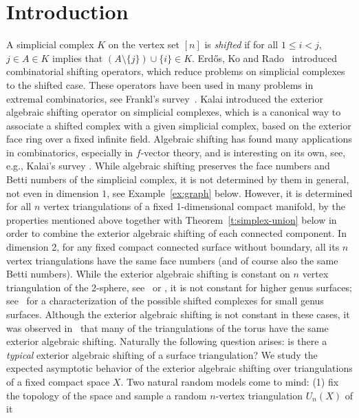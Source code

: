 \documentclass[11pt]{article}
\numberwithin{claimcounter}{theorem}
\theoremstyle{remark}
\theoremstyle{definition}
\numberwithin{theorem}{section}
\begin{document}
\section{Introduction}
A simplicial complex $K$ on the vertex set $[n]$ is \emph{shifted} if for all $1\le i <j$,   $j\in A\in K$ implies that 
$(A\setminus \{j\})\cup \{i\} \in K$.
Erd\H{o}s, Ko and Rado~\cite{erdos61-intersection} introduced
combinatorial shifting operators, which reduce problems on simplicial complexes to the shifted case. These operators have been used 
in many problems in extremal combinatorics, see Frankl's survey~\cite{frankl87-shifting}. 
Kalai \cite{KalaiPart1} introduced the exterior algebraic shifting operator on simplicial complexes, which is a canonical way to associate a shifted complex with a given simplicial complex, based on the exterior face ring over a fixed infinite field. 
Algebraic shifting has found many applications in combinatorics, especially in $f$-vector theory, and is interesting on its own, see, e.g., Kalai's survey 
\cite{kalai02-shifting}.  
%
While algebraic shifting preserves the face numbers and Betti numbers of the  simplicial complex, it is not determined by them in general, not even in dimension $1$, see Example~\ref{ex:graph} below. However, it is determined for all $n$ vertex triangulations of a fixed 1-dimensional compact manifold, by the properties mentioned above together with Theorem~\ref{t:simplex-union} below in order to combine the exterior algebraic shifting of each connected component.
In dimension 2, 
for any fixed compact connected surface without boundary, all its $n$ vertex triangulations have the same face numbers (and of course also the same Betti numbers).
While the exterior algebraic shifting is constant on $n$ vertex triangulation of the 2-sphere, see~\cite[Sec.2.4]{kalai02-shifting} or \cite[Footnote 2]{keehn24-exterior}, it is not constant for higher genus surfaces; see~\cite{keehn24-exterior} for a characterization of the possible shifted complexes for small genus surfaces. 
Although the exterior algebraic shifting is not constant in these cases, it was observed in~\cite[Remarks 5.3]{keehn24-exterior} that many of the triangulations of the torus have the same exterior algebraic shifting. Naturally the following question arises: is there a \emph{typical} exterior algebraic shifting of a surface triangulation?
%
%
We study the expected asymptotic behavior of the exterior algebraic shifting  
over triangulations of a fixed compact space $X$.
Two natural random models come to mind:
(1)
fix the topology of the space and sample a random $n$-vertex triangulation $U_n(X)$ of it
\end{document}
